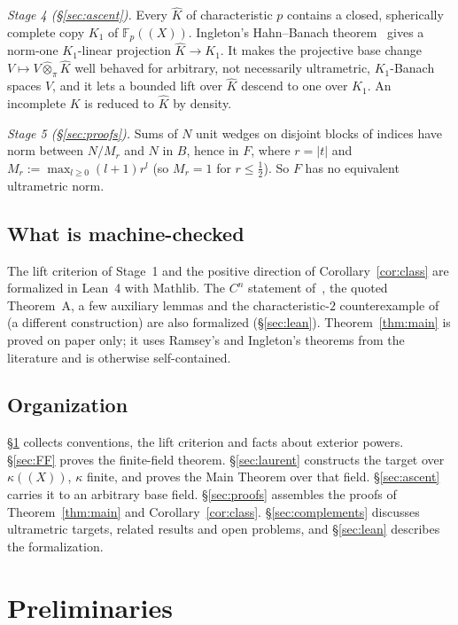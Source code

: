 \documentclass[11pt]{amsart}
\theoremstyle{definition}
\theoremstyle{remark}
\numberwithin{equation}{section}
\newcommand{\F}{\mathbb{F}}
\newcommand{\Kh}{\widehat K}
\newcommand{\abs}[1]{\lvert #1\rvert}
\begin{document}
\emph{Stage 4 (\S\ref{sec:ascent}).} Every $\Kh$ of characteristic $p$ contains a closed, spherically complete copy
$K_1$ of $\F_p((X))$. Ingleton's Hahn--Banach theorem~\cite{In} gives a norm-one $K_1$\nobreakdash-linear projection $\Kh\to K_1$.
It makes the projective base change $V\mapsto V\widehat\otimes_\pi\Kh$ well behaved for arbitrary, not necessarily
ultrametric, $K_1$\nobreakdash-Banach spaces $V$, and it lets a bounded lift over $\Kh$ descend to one over $K_1$. An incomplete $K$
is reduced to $\Kh$ by density.

\emph{Stage 5 (\S\ref{sec:proofs}).} Sums of $N$ unit wedges on disjoint blocks of indices have norm between $N/M_r$ and
$N$ in $B$, hence in $F$, where $r=\abs t$ and $M_r:=\max_{l\ge0}(l+1)r^l$ (so $M_r=1$ for $r\le\frac12$). So $F$ has no
equivalent ultrametric norm.

\subsection*{What is machine-checked}
The lift criterion of Stage~1 and the positive direction of Corollary~\ref{cor:class} are formalized in Lean~4
with Mathlib. The $C^n$ statement of~\cite{PR}, the quoted Theorem~A, a few auxiliary lemmas and the characteristic-$2$
counterexample of~\cite{M} (a different construction) are also formalized (\S\ref{sec:lean}). Theorem~\ref{thm:main}
is proved on paper only; it uses Ramsey's and Ingleton's theorems from the literature and is otherwise self-contained.

\subsection*{Organization}
\S\ref{sec:prelim} collects conventions, the lift criterion and facts about exterior powers.
\S\ref{sec:FF} proves the finite-field theorem. \S\ref{sec:laurent} constructs the target over $\kappa((X))$, $\kappa$
finite, and proves the Main Theorem over that field. \S\ref{sec:ascent} carries it to an arbitrary base field. \S\ref{sec:proofs} assembles the
proofs of Theorem~\ref{thm:main} and Corollary~\ref{cor:class}. \S\ref{sec:complements} discusses ultrametric targets,
related results and open problems, and \S\ref{sec:lean} describes the formalization.

\section{Preliminaries}\label{sec:prelim}
\end{document}
